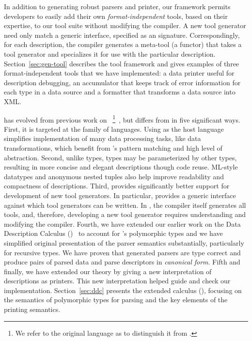 In addition to generating robust parsers and printer, our framework permits
developers to easily add their own {\em format-independent} 
tools, based on their expertise,
to our tool suite without modifying the \padsml{} compiler.  A new
tool generator need only match a generic interface, specified as an
\ml{} signature.  Correspondingly, for each \padsml{} description, the
\padsml{} compiler generates a meta-tool (a functor)
that takes a tool generator and specializes it for use with
the particular description.  Section~\ref{sec:gen-tool} describes the
tool framework and gives examples of three format-independent 
tools that we have
implemented: a data printer useful for description debugging,
an accumulator that keeps track of error information for
each type in a data source and a formatter that transforms a data
source into XML.

\padsml{} has evolved from previous work on
\padsc{}~\footnote{We refer to the original
\pads{} language as \padsc{} to distinguish it from \padsml{}.}~\cite{fisher+:pads}, but
\padsml{} differs from \padsc{} in five significant ways.  First, it
is targeted at the \ml{} family of languages.  Using \ml{} as the host
language simplifies implementation of many data processing tasks, like
data transformations, which benefit from \ml{}'s pattern matching and
high level of abstraction.  Second, unlike \padsc{} types, \padsml{}
types may be parameterized by other types, resulting in more concise
and elegant descriptions though code reuse.  ML-style datatypes and 
anonymous nested tuples also help improve readability and compactness
of descriptions.  Third, \padsml{} provides
significantly better support for development of new tool generators.
In particular, \padsml{} provides a generic interface against which
tool generators can be written.  In \padsc{}, the compiler itself
generates all tools, and, therefore, developing a new tool generator
requires understanding and modifying the compiler.
Fourth, we have extended our earlier work on the Data Description Calculus
(\ddcold{})~\cite{fisher+:next700ddl} to account for \padsml{}'s
polymorphic types and we have simplified original presentation
of the parser semantics substantially, particularly for recursive types.  
We have 
proven that generated
parsers are type correct and
produce pairs of parsed data and parse descriptors in {\em canonical form}.  
Fifth and finally, we have extended our theory by giving a new interpretation of
\ddc{} descriptions as printers.  This new interpretation
helped guide and check our \padsml{} implementation.
Section~\ref{sec:ddc} presents the extended
calculus (\ddc{}), focusing on the semantics of 
polymorphic types for parsing and the key elements of the
printing semantics.

